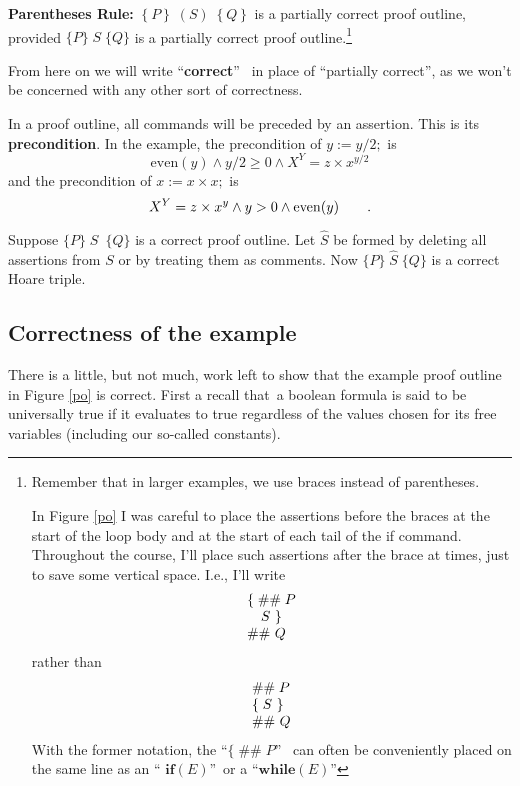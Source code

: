 \documentclass[muchmore,11pt]{article}%
\begin{document}
\textbf{Parentheses Rule:} $\left\{  P\right\}  \;(S)\;\left\{  Q\right\}  $
is a partially correct proof outline, provided $\{P\}\;S\;\{Q\}$ is a
partially correct proof outline.\footnote{Remember that in larger examples, we
use braces instead of parentheses.
\par
In Figure \ref{po} I was careful to place the assertions before the braces at
the start of the loop body and at the start of each tail of the if command.
Throughout the course, I'll place such assertions after the brace at times,
just to save some vertical space. I.e., I'll write%
\[%
\begin{array}
[t]{l}%
\{\;\#\#\;P\\
\quad S\ \}\\
\#\#\ Q
\end{array}
\]
rather than%
\[%
\begin{array}
[t]{l}%
\#\#\;P\\
\{\;S\ \}\\
\#\#\ Q
\end{array}
\]
With the former notation, the \textquotedblleft$\{\;\#\#\;P$\textquotedblright%
\ can often be conveniently placed on the same line as an \textquotedblleft%
$\mathbf{if}(E)$\textquotedblright\ or a \textquotedblleft$\mathbf{while}%
(E)$\textquotedblright}

From here on we will write \textquotedblleft\textbf{correct}\textquotedblright%
\ in place of \textquotedblleft partially correct\textquotedblright, as we
won't be concerned with any other sort of correctness.

In a proof outline, all commands will be preceded by an assertion. This is its
\textbf{precondition}. In the example, the precondition of $y:=y/2;$ is
\[
\mathrm{even}(y)\wedge y/2\geq0\wedge X^{Y}=z\times x^{y/2}%
\]
and the precondition of $x:=x\times x;$ is%
\[
X^{Y}=z\times x^{y}\wedge y>0\wedge\mathrm{even}(y)\text{\qquad.}%
\]


Suppose $\{P\}\;S$\ $\{Q\}$ is a correct proof outline. Let $\widehat{S}$ be
formed by deleting all assertions from $S$ or by treating them as comments.
Now $\{P\}\;\widehat{S}\;\{Q\}$ is a correct Hoare triple.

\subsection{Correctness of the example}

There is a little, but not much, work left to show that the example proof
outline in Figure \ref{po} is correct. First a recall that\ a boolean formula
is said to be universally true if it evaluates to true regardless of the
values chosen for its free variables (including our so-called constants).
\end{document}
